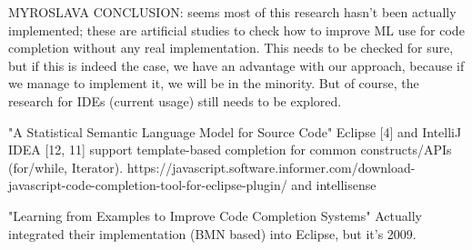 MYROSLAVA CONCLUSION: seems most of this research hasn't been actually implemented; these are
artificial studies to check how to improve ML use for code completion without any real
implementation. This needs to be checked for sure, but if this is indeed the case, we have an
advantage with our approach, because if we manage to implement it, we will be in the minority.
But of course, the research for IDEs (current usage) still needs to be explored.

"A Statistical Semantic Language Model for Source Code"
Eclipse [4] and IntelliJ IDEA [12, 11] support template-based completion for common
constructs/APIs (for/while, Iterator).
https://javascript.software.informer.com/download-javascript-code-completion-tool-for-eclipse-plugin/
and intellisense

"Learning from Examples to Improve Code Completion Systems"
Actually integrated their implementation (BMN based) into Eclipse, but it's 2009.